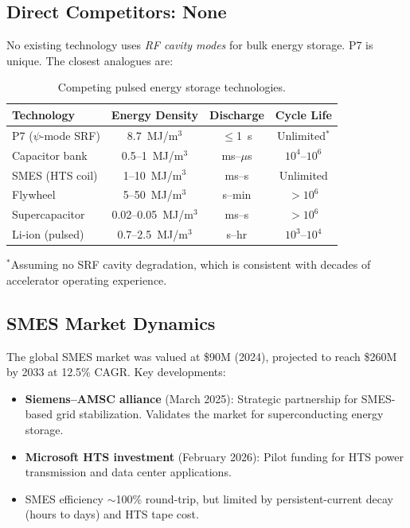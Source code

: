 \documentclass[11pt]{article}
\begin{document}
\subsection{Direct Competitors: None}

No existing technology uses \emph{RF cavity modes} for bulk energy
storage. P7 is unique. The closest analogues are:

\begin{table}[h]
\centering
\caption{Competing pulsed energy storage technologies.}
\label{tab:competition}
\begin{tabular}{@{}lccc@{}}
\toprule
\textbf{Technology} & \textbf{Energy Density} & \textbf{Discharge}
& \textbf{Cycle Life} \\
\midrule
P7 ($\psi$-mode SRF) & 8.7~MJ/m$^3$ & $\leq$1~s & Unlimited$^*$ \\
Capacitor bank & 0.5--1~MJ/m$^3$ & ms--$\mu$s & $10^4$--$10^6$ \\
SMES (HTS coil) & 1--10~MJ/m$^3$ & ms--s & Unlimited \\
Flywheel & 5--50~MJ/m$^3$ & s--min & $>10^6$ \\
Supercapacitor & 0.02--0.05~MJ/m$^3$ & ms--s & $>10^6$ \\
Li-ion (pulsed) & 0.7--2.5~MJ/m$^3$ & s--hr & $10^3$--$10^4$ \\
\bottomrule
\end{tabular}
\end{table}

$^*$Assuming no SRF cavity degradation, which is consistent with
decades of accelerator operating experience.

\subsection{SMES Market Dynamics}

The global SMES market was valued at \$90M (2024), projected to reach
\$260M by 2033 at 12.5\% CAGR. Key developments:
\begin{itemize}
\item \textbf{Siemens--AMSC alliance} (March 2025): Strategic
  partnership for SMES-based grid stabilization. Validates the
  market for superconducting energy storage.
\item \textbf{Microsoft HTS investment} (February 2026): Pilot
  funding for HTS power transmission and data center applications.
\item SMES efficiency $\sim$100\% round-trip, but limited by
  persistent-current decay (hours to days) and HTS tape cost.
\end{itemize}
\end{document}
